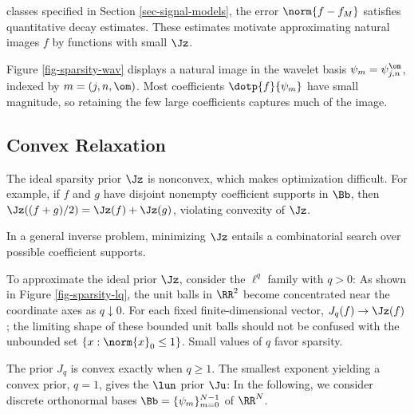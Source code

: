  classes specified in Section \ref{sec-signal-models}, the error $\norm{f-f_M}$ satisfies quantitative decay estimates. These estimates motivate approximating natural images $f$ by functions with small $\Jz$.

Figure \ref{fig-sparsity-wav} displays a natural image in the wavelet basis $\psi_m = \psi_{j,n}^\om$, indexed by $m=(j,n,\om)$. Most coefficients $\dotp{f}{\psi_m}$ have small magnitude, so retaining the few large coefficients captures much of the image.



                                                                      
\subsection{Convex Relaxation}

The ideal sparsity prior $\Jz$ is nonconvex, which makes optimization difficult. For example, if $f$ and $g$ have disjoint nonempty coefficient supports in $\Bb$, then $\Jz( (f+g)/2 ) = \Jz(f)+\Jz(g)$, violating convexity of $\Jz$.

In a general inverse problem, minimizing $\Jz$ entails a combinatorial search over possible coefficient supports.

To approximate the ideal prior $\Jz$, consider the $\ell^q$ family with $q>0$:
As shown in Figure \ref{fig-sparsity-lq}, the unit balls in $\RR^2$ become concentrated near the coordinate axes as $q\downarrow0$. For each fixed finite-dimensional vector, $J_q(f)\to\Jz(f)$; the limiting shape of these bounded unit balls should not be confused with the unbounded set $\{x:\norm{x}_0\leq1\}$. Small values of $q$ favor sparsity.




The prior $J_q$ is convex exactly when $q \geq 1$. The smallest exponent yielding a convex prior, $q=1$, gives the $\lun$ prior $\Ju$:
In the following, we consider discrete orthonormal bases $\Bb = \{\psi_m\}_{m=0}^{N-1}$ of $\RR^N$.


